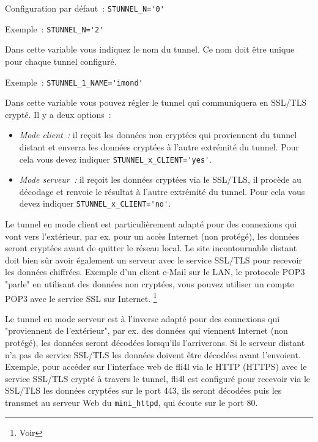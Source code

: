 \begin{description}
Configuration par défaut~: \verb+STUNNEL_N='0'+

Exemple~: \verb+STUNNEL_N='2'+


Dans cette variable vous indiquez le nom du tunnel. Ce nom doit être unique pour chaque
tunnel configuré.

Exemple~: \verb+STUNNEL_1_NAME='imond'+


Dans cette variable vous pouvez régler le tunnel qui communiquera en SSL/TLS crypté.
Il y a deux options~:

\begin{itemize}
\item \emph{Mode client~:} il reçoit les données non cryptées qui proviennent du tunnel
distant et enverra les données cryptées à l'autre extrémité du tunnel. Pour cela vous devez
indiquer \verb+STUNNEL_x_CLIENT='yes'+.
\item \emph{Mode serveur~:} il reçoit les données cryptées via le SSL/TLS, il procède
au décodage et renvoie le résultat à l'autre extrémité du tunnel. Pour cela vous devez
indiquer \verb+STUNNEL_x_CLIENT='no'+.
\end{itemize}

Le tunnel en mode client est particulièrement adapté pour des connexions qui vont
vers l'extérieur, par ex. pour un accès Internet (non protégé), les données seront
cryptées avant de quitter le réseau local. Le site incontournable distant doit bien
sûr avoir également un serveur avec le service SSL/TLS pour recevoir les données
chiffrées. Exemple d'un client e-Mail sur le LAN, le protocole POP3 "parle" en utilisant
des données non cryptées, vous pouvez utiliser un compte POP3 avec le service SSL sur
Internet. \footnote{Voir }

Le tunnel en mode serveur est à l'inverse adapté pour des connexions qui "proviennent
de l'extérieur", par ex. des données qui viennent Internet (non protégé), les données
seront décodées lorsqu'ils l'arriverons. Si le serveur distant n'a pas de service SSL/TLS
les données doivent être décodées avant l'envoient. Exemple, pour accéder sur l'interface
web de fli4l via le HTTP (HTTPS) avec le service SSL/TLS crypté à travers le tunnel, fli4l est
configuré pour recevoir via le SSL/TLS les données cryptées sur le port 443, ils seront
décodées puis les transmet au serveur Web du \texttt{mini\_httpd}, qui écoute sur le port 80.


\end{description}
